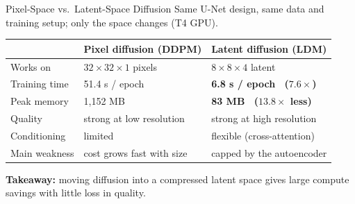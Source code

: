 \documentclass[11pt,aspectratio=169]{beamer}
\newcommand{\Head}[1]{\textcolor{Main}{\textbf{#1}}}
\newcommand{\Key}[1]{\textcolor{Accent}{\textbf{#1}}}
\begin{document}
\begin{frame}{Pixel-Space vs.\ Latent-Space Diffusion}
  \small
  Same U-Net design, same data and training setup; only the space changes (T4 GPU).

  \vspace{0.1cm}
  \centering
  \small
  \renewcommand{\arraystretch}{1.25}
  \begin{tabular}{@{}p{3.3cm}p{4.6cm}p{4.6cm}@{}}
    \toprule
    & \textbf{Pixel diffusion (DDPM)} & \textbf{Latent diffusion (LDM)} \\
    \midrule
    Works on       & $32\times32\times1$ pixels & $8\times8\times4$ latent \\
    Training time  & 51.4 s / epoch & \Key{6.8 s / epoch \ ($7.6\times$)} \\
    Peak memory    & 1{,}152 MB & \Key{83 MB \ ($13.8\times$ less)} \\
    Quality        & strong at low resolution & strong at high resolution \cite{rombach2022high} \\
    Conditioning   & limited & flexible (cross-attention) \\
    Main weakness  & cost grows fast with size & capped by the autoencoder \\
    \bottomrule
  \end{tabular}

  \vspace{0.2cm}
  \raggedright
  \Head{Takeaway:} moving diffusion into a compressed latent space gives large compute savings with little loss in quality.
\end{frame}
\end{document}

